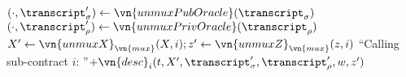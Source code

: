 \begin{algorithmic}
    \State \Let $(\cdot, \transcript_\sigma') \gets
      \vn{unmuxPubOracle}(\transcript_\sigma)$
    \State \Let$(\cdot, \transcript_\rho') \gets
      \vn{unmuxPrivOracle}(\transcript_\rho)$
    \State \Let $X' \gets \vn{unmuxX}_{\vn{mux}}(X, i); z' \gets
      \vn{unmuxZ}_{\vn{mux}}(z, i)$
    \State \Return ``Calling sub-contract $i$: ''$+ \vn{desc}_i(t, X',
      \transcript_\sigma', \transcript_\rho', w, z')$
  \EndFunction
\end{algorithmic}
